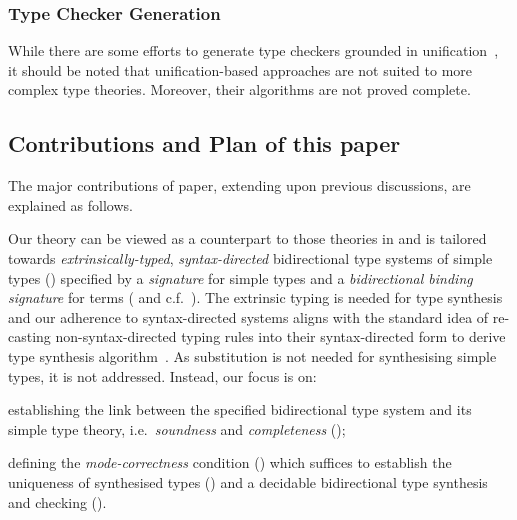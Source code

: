 \subsubsection{Type Checker Generation}
While there are some efforts to generate type checkers grounded in unification~\citep{Gast2004,Grewe2015}, it should be noted that unification-based approaches are not suited to more complex type theories.
Moreover, their algorithms are not proved complete.

\subsection{Contributions and Plan of this paper}
The major contributions of paper, extending upon previous discussions, are explained as follows.

Our theory can be viewed as a counterpart to those theories in  and is tailored towards \emph{extrinsically-typed}, \emph{syntax-directed} bidirectional type systems of simple types () specified by a \emph{signature} for simple types and a \emph{bidirectional binding signature} for terms ( and c.f.\ ). 
The extrinsic typing is needed for type synthesis and our adherence to syntax-directed systems aligns with the standard idea of re-casting non-syntax-directed typing rules into their syntax-directed form to derive type synthesis algorithm~\citep{Peyton-Jones2007}.
As substitution is not needed for synthesising simple types, it is not addressed.
Instead, our focus is on:
\begin{enumerate*}
  \item establishing the link between the specified bidirectional type system and its simple type theory, i.e.\ \emph{soundness} and \emph{completeness} (); 
  \item defining the \emph{mode-correctness} condition () which suffices to establish the uniqueness of synthesised types () and a decidable bidirectional type synthesis and checking ().
\end{enumerate*}

